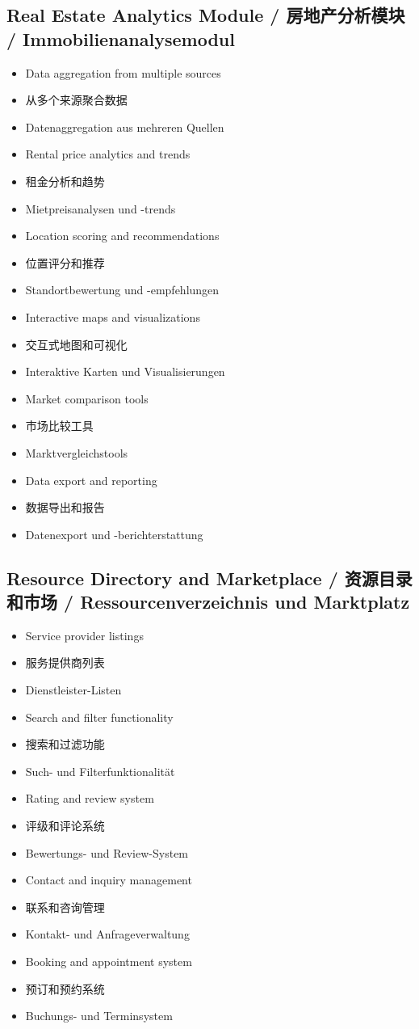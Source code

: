 \subsection{Real Estate Analytics Module / 房地产分析模块 / Immobilienanalysemodul}
\begin{itemize}
    \item Data aggregation from multiple sources
    \item 从多个来源聚合数据
    \item Datenaggregation aus mehreren Quellen
    \item Rental price analytics and trends
    \item 租金分析和趋势
    \item Mietpreisanalysen und -trends
    \item Location scoring and recommendations
    \item 位置评分和推荐
    \item Standortbewertung und -empfehlungen
    \item Interactive maps and visualizations
    \item 交互式地图和可视化
    \item Interaktive Karten und Visualisierungen
    \item Market comparison tools
    \item 市场比较工具
    \item Marktvergleichstools
    \item Data export and reporting
    \item 数据导出和报告
    \item Datenexport und -berichterstattung
\end{itemize}

\subsection{Resource Directory and Marketplace / 资源目录和市场 / Ressourcenverzeichnis und Marktplatz}
\begin{itemize}
    \item Service provider listings
    \item 服务提供商列表
    \item Dienstleister-Listen
    \item Search and filter functionality
    \item 搜索和过滤功能
    \item Such- und Filterfunktionalität
    \item Rating and review system
    \item 评级和评论系统
    \item Bewertungs- und Review-System
    \item Contact and inquiry management
    \item 联系和咨询管理
    \item Kontakt- und Anfrageverwaltung
    \item Booking and appointment system
    \item 预订和预约系统
    \item Buchungs- und Terminsystem
\end{itemize}

